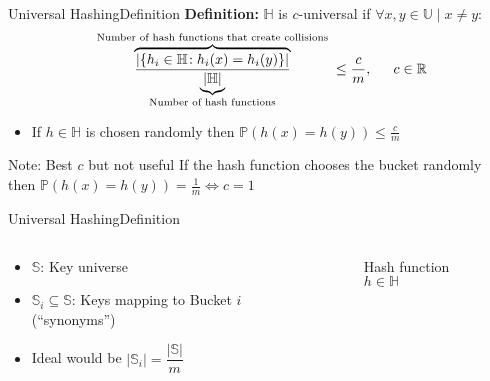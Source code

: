 \begin{frame}{Universal Hashing}{Definition}
  \textbf{Definition:}
  $\mathbb{H}$ is {\color{Mittel-Blau}$c$-universal} if
  $\forall x, y \in \mathbb{U} \mid x \neq y:$
  \[
    \overbrace{
      \frac{
        \vert \{h_i \in \mathbb{H}\!: h_i(x) = h_i(y)\} \vert
      }{
      \underbrace{\vert \mathbb{H} \vert}_\text{Number of hash functions}
      }
    }^\text{
      Number of hash functions that create collisions
    }
    \leq \frac{c}{m}, \hspace*{1.5em} c \in \mathbb{R}
  \]
  \begin{itemize}
    \item
      If $h \in \mathbb{H}$ is chosen randomly then
      $\mathbb{P}(h(x) = h(y)) \leq \frac{c}{m}$
  \end{itemize}
  \begin{block}{Note: Best $c$ but not useful}
    If the hash function chooses the {\color{Mittel-Blau}bucket} 
    randomly then
    $\mathbb{P}(h(x) = h(y)) = \frac{1}{m} \Leftrightarrow c = 1$
  \end{block}
\end{frame}


\begin{frame}{Universal Hashing}{Definition}
  \begin{columns}
    \begin{column}{0.5\linewidth}
      \begin{itemize}
        \item
          $\mathbb{S}$:
          Key universe
        \item
          $\mathbb{S}_i \subseteq \mathbb{S}$:
          Keys mapping to Bucket $i$ (\enquote{synonyms})
       \item
         Ideal would be
         $\vert \mathbb{S}_i \vert =\dfrac{\vert \mathbb{S} \vert}{m}$
      \end{itemize}
    \end{column}
    \begin{column}{0.5\linewidth}
      \begin{figure}[!h]%
        \centering%
        \caption{Hash function $h \in \mathbb{H}$}%
        \label{fig:hash_function_to_bucket}
      \end{figure}
    \end{column}
  \end{columns}
\end{frame}

